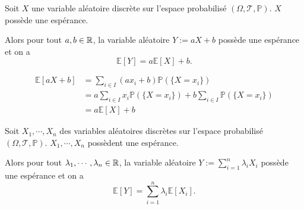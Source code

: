 \documentclass[a4paper, 12pt]{article}
\begin{document}
\begin{corollaire}{}{}
    Soit $X$ une variable aléatoire discrète sur l'espace probabilisé $(\Omega, \mathcal{T}, \mathbb{P})$.
    $X$ possède une espérance.

    Alors pour tout $a, b \in \mathbb{R}$, la variable aléatoire $Y:= aX + b$ possède une espérance et on a
    $$
    \mathbb{E}[Y] = a \mathbb{E}[X] + b.
    $$
\end{corollaire}

\begin{demonstration}
    \begin{align*}
        \mathbb{E}[aX + b] &= \sum_{i \in I} (a x_i + b) \mathbb{P}(\{ X = x_i \}) \\
        &= a \sum_{i \in I} x_i \mathbb{P}(\{ X = x_i \}) + b \sum_{i \in I} \mathbb{P}(\{ X = x_i \}) \\
        &= a \mathbb{E}[X] + b
    \end{align*}
\end{demonstration}

\begin{corollaire}{}{}
    Soit $X_1, \cdots, X_n$ des variables aléatoires discrètes sur l'espace probabilisé $(\Omega, \mathcal{T}, \mathbb{P})$.
    $X_1, \cdots, X_n$ possèdent une espérance.

    Alors pour tout $\lambda_1, \cdots, \lambda_n \in \mathbb{R}$, la variable aléatoire $Y:= \sum_{i=1}^n \lambda_i X_i$ possède une espérance et on a
    $$
    \mathbb{E}[Y] = \sum_{i=1}^n \lambda_i \mathbb{E}[X_i].
    $$
\end{corollaire}

\begin{demonstration}
\end{demonstration}
\end{document}

